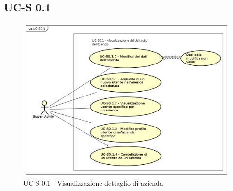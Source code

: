\subsection{UC-S 0.1}
    \begin{figure}[h]
      \begin{center}
        \includegraphics[width=12cm]{res/img/UCSuperadmin/UCS0.1.png}
      \caption{UC-S 0.1 - Visualizzazione dettaglio di azienda}
      \end{center} 
    \end{figure}    
    
